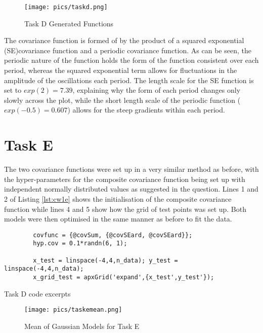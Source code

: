 \documentclass[11pt]{amsart}
\begin{document}
\begin{figure}[]
    \centering
    \texttt{[image: pics/taskd.png]}
    \caption{Task D Generated Functions}
    \label{fig:taskd}
\end{figure}

The covariance function is formed of by the product of a squared exponential (SE)covariance function and a periodic covariance function. As can be seen, the periodic nature of the function holds the form of the function consistent over each period, whereas the squared exponential term allows for fluctuations in the amplitude of the oscillations each period. The length scale for the SE function is set to $exp(2)=7.39$, explaining why the form of each period changes only slowly across the plot, while the short length scale of the periodic function ($exp(-0.5) = 0.607$) allows for the steep gradients within each period.

\section{Task E}
The two covariance functions were set up in a very similar method as before, with the hyper-parameters for the composite covariance function being set up with independent normally distributed values as suggested in the question. Lines 1 and 2 of Listing \ref{lst:cw1e} shows the initialisation of the composite covariance function while lines 4 and 5 show how the grid of test points was set up. Both models were then optimised in the same manner as before to fit the data. 

\begin{listing}[H]
    \begin{verbatim}
        covfunc = {@covSum, {@covSEard, @covSEard}};
        hyp.cov = 0.1*randn(6, 1);

        x_test = linspace(-4,4,n_data); y_test = linspace(-4,4,n_data);
        x_grid_test = apxGrid('expand',{x_test',y_test'});

    \end{verbatim}
    \caption{Task D code excerpts} \label{lst:cw1e}
\end{listing}


\begin{figure}[]
    \centering
    \texttt{[image: pics/taskemean.png]}
    \caption{Mean of Gaussian Models for Task E}
    \label{fig:taskemean}
\end{figure}
\end{document}
